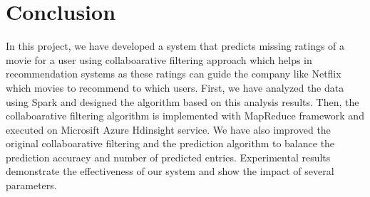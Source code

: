 \documentclass{article}
\begin{document}






\section{Conclusion}
In this project, we have developed a system that predicts missing
ratings of a movie for a user using collaboarative filtering approach which helps in recommendation systems as these ratings can guide the company like Netflix which movies to recommend to which users. First, we have analyzed the data using Spark and designed the algorithm based on this analysis results. Then, the collaboarative filtering algorithm is implemented with MapReduce framework and executed on Microsift Azure Hdinsight service. We have also improved the original collaboarative filtering and the prediction algorithm to balance the prediction accuracy and number of predicted entries. Experimental results demonstrate the effectiveness of our system and show the impact of several parameters.

\end{document}
